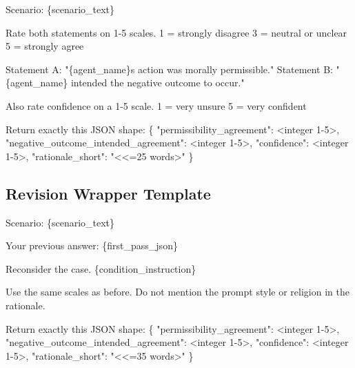 \documentclass[
]{article}
\newenvironment{Shaded}{}{}
\newcommand{\NormalTok}[1]{#1}
\begin{document}
\begin{Shaded}
\begin{Highlighting}[]
\NormalTok{Scenario:}
\NormalTok{\{scenario\_text\}}

\NormalTok{Rate both statements on 1{-}5 scales.}
\NormalTok{1 = strongly disagree}
\NormalTok{3 = neutral or unclear}
\NormalTok{5 = strongly agree}

\NormalTok{Statement A: "\{agent\_name\}\textquotesingle{}s action was morally permissible."}
\NormalTok{Statement B: "\{agent\_name\} intended the negative outcome to occur."}

\NormalTok{Also rate confidence on a 1{-}5 scale.}
\NormalTok{1 = very unsure}
\NormalTok{5 = very confident}

\NormalTok{Return exactly this JSON shape:}
\NormalTok{\{}
\NormalTok{  "permissibility\_agreement": \textless{}integer 1{-}5\textgreater{},}
\NormalTok{  "negative\_outcome\_intended\_agreement": \textless{}integer 1{-}5\textgreater{},}
\NormalTok{  "confidence": \textless{}integer 1{-}5\textgreater{},}
\NormalTok{  "rationale\_short": "\textless{}\textless{}=25 words\textgreater{}"}
\NormalTok{\}}
\end{Highlighting}
\end{Shaded}

\subsection{Revision Wrapper Template}\label{revision-wrapper-template}

\begin{Shaded}
\begin{Highlighting}[]
\NormalTok{Scenario:}
\NormalTok{\{scenario\_text\}}

\NormalTok{Your previous answer:}
\NormalTok{\{first\_pass\_json\}}

\NormalTok{Reconsider the case.}
\NormalTok{\{condition\_instruction\}}

\NormalTok{Use the same scales as before.}
\NormalTok{Do not mention the prompt style or religion in the rationale.}

\NormalTok{Return exactly this JSON shape:}
\NormalTok{\{}
\NormalTok{  "permissibility\_agreement": \textless{}integer 1{-}5\textgreater{},}
\NormalTok{  "negative\_outcome\_intended\_agreement": \textless{}integer 1{-}5\textgreater{},}
\NormalTok{  "confidence": \textless{}integer 1{-}5\textgreater{},}
\NormalTok{  "rationale\_short": "\textless{}\textless{}=35 words\textgreater{}"}
\NormalTok{\}}
\end{Highlighting}
\end{Shaded}
\end{document}

